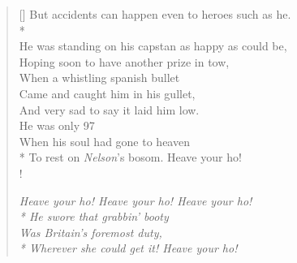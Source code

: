 \documentclass[MAIN]{subfiles}
\begin{document}
\begin{verse}[\versewidth]
But accidents can happen even to heroes such as he.\\*
\\
He was standing on his capstan as happy as could be,\\
Hoping soon to have another prize in tow,\\
When a whistling spanish bullet\\
Came and caught him in his gullet,\\
And very sad to say it laid him low.\\
He was only 97\\
When his soul had gone to heaven\\*
To rest on \emph{Nelson}'s bosom. Heave your ho!\\!

{\it Heave your ho! Heave your ho! Heave your ho!\\*
He swore that grabbin' booty\\
Was Britain's foremost duty,\\*
Wherever she could get it! Heave your ho!}

\end{verse}
\end{document}
